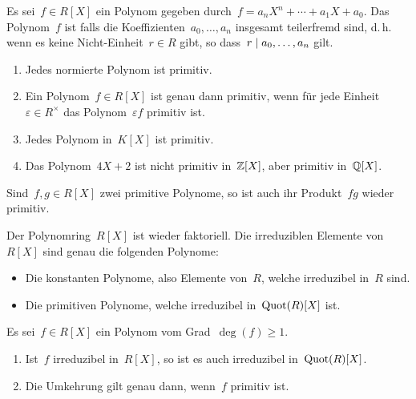\begin{definition}
  Es sei~$f \in R[X]$ ein Polynom gegeben durch~$f = a_n X^n + \dotsb + a_1 X + a_0$.
  Das Polynom~$f$ ist  falls die Koeffizienten~$a_0, \dotsc, a_n$ insgesamt teilerfremd sind, d.\,h. wenn es keine Nicht-Einheit~$r \in R$ gibt, so dass~$r \mid a_0, \dotsc, a_n$ gilt.
\end{definition}

\begin{example}
  \leavevmode
  \begin{enumerate}
    \item
      Jedes normierte Polynom ist primitiv.
    \item
      Ein Polynom~$f \in R[X]$ ist genau dann primitiv, wenn für jede Einheit~$\varepsilon \in R^\times$ das Polynom~$\varepsilon f$ primitiv ist.
    \item
      Jedes Polynom in~$K[X]$ ist primitiv.
    \item
      Das Polynom~$4X + 2$ ist nicht primitiv in~$\mathbb{Z}[X]$, aber primitiv in~$\mathbb{Q}[X]$.
  \end{enumerate}
\end{example}

\begin{proposition}
  Sind~$f, g \in R[X]$ zwei primitive Polynome, so ist auch ihr Produkt~$fg$ wieder primitiv.
\end{proposition}

\begin{theorem}
  Der Polynomring~$R[X]$ ist wieder faktoriell.
  Die irreduziblen Elemente von~$R[X]$ sind genau die folgenden Polynome:
  \begin{itemize}
    \item
      Die konstanten Polynome, also Elemente von~$R$, welche irreduzibel in~$R$ sind.
    \item
      Die primitiven Polynome, welche irreduzibel in~$\operatorname{Quot}(R)[X]$ ist.
  \end{itemize}
\end{theorem}

\begin{corollary}
  Es sei~$f \in R[X]$ ein Polynom vom Grad~$\deg(f) \geq 1$.
  \begin{enumerate}
    \item
      Ist~$f$ irreduzibel in~$R[X]$, so ist es auch irreduzibel in~$\operatorname{Quot}(R)[X]$.
    \item
      Die Umkehrung gilt genau dann, wenn~$f$ primitiv ist.
  \end{enumerate}
\end{corollary}

